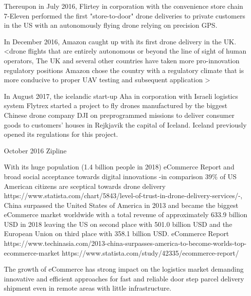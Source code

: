 Thereupon in July 2016, Flirtey in corporation with 
the convenience store chain 7-Eleven 
performed the first "store-to-door" drone deliveries to private customers
in the US with an autonomously flying drone relying on precision GPS.

In December 2016, Amazon caught up with its first drone delivery
in the UK. 
<drone flights that are entirely autonomous or beyond the line of sight of human operators,
The UK and several other countries have taken more pro-innovation regulatory positions
Amazon chose the country with a regulatory climate that is more conducive to proper UAV testing and subsequent application
>

In August 2017, the icelandic start-up Aha in corporation with Israeli logistics system Flytrex 
started a project to fly drones 
manufactured by the biggest Chinese drone company DJI
on preprogrammed missions to deliver consumer goods to customers' houses
in Rejkjavik the capital of Iceland. 
Iceland previously opened its regulations for this project.
\cite{Ross2018}


October 2016 Zipline


With its huge population (1.4 billion people in 2018)
eCommerce Report
and broad social acceptance towards digital innovations
-in comparison 39\% of US American citizens
are sceptical towards drone delivery
https://www.statista.com/chart/5843/level-of-trust-in-drone-delivery-services/-,
China surpassed the United States of America in 2013 and
became the biggest eCommerce market worldwide with
a total revenue of approximately 633.9 billion USD in 2018
leaving the US on second place with 501.0 billion USD and 
the European Union on third place with 358.1 billion USD.
eCommerce Report
https://www.techinasia.com/2013-china-surpasses-america-to-become-worlds-top-ecommerce-market
https://www.statista.com/study/42335/ecommerce-report/

The growth of eCommerce has
strong impact on the logistics market
demanding innovative and efficient approaches
for fast and reliable door step parcel delivery shipment
even in remote areas with little infrastructure.



